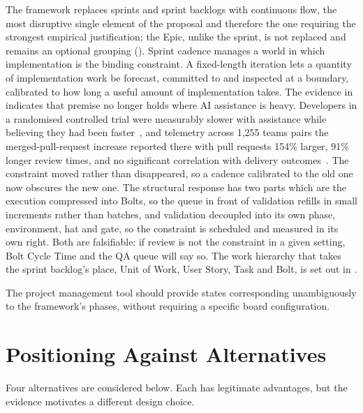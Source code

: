 The framework replaces sprints and sprint backlogs with continuous flow, the most disruptive single element of the proposal and therefore the one requiring the strongest empirical justification; the Epic, unlike the sprint, is not replaced and remains an optional grouping (). Sprint cadence manages a world in which implementation is the binding constraint. A fixed-length iteration lets a quantity of implementation work be forecast, committed to and inspected at a boundary, calibrated to how long a useful amount of implementation takes. The evidence in  indicates that premise no longer holds where AI assistance is heavy. Developers in a randomised controlled trial were measurably slower with assistance while believing they had been faster~\cite{Becker:2025rct}, and telemetry across 1,255 teams pairs the merged-pull-request increase reported there with pull requests 154\% larger, 91\% longer review times, and no significant correlation with delivery outcomes~\cite{Faros:2025par}. The constraint moved rather than disappeared, so a cadence calibrated to the old one now obscures the new one. The structural response has two parts which are the execution compressed into Bolts, so the queue in front of validation refills in small increments rather than batches, and validation decoupled into its own phase, environment, hat and gate, so the constraint is scheduled and measured in its own right. Both are falsifiable: if review is not the constraint in a given setting, Bolt Cycle Time and the \ac{QA} queue will say so. The work hierarchy that takes the sprint backlog's place, Unit of Work, User Story, Task and Bolt, is set out in .

The project management tool should provide states corresponding unambiguously to the framework's phases, without requiring a specific board configuration.

\section{Positioning Against Alternatives}
\label{sec:alternatives}

Four alternatives are considered below. Each has legitimate advantages, but the evidence motivates a different design choice.

